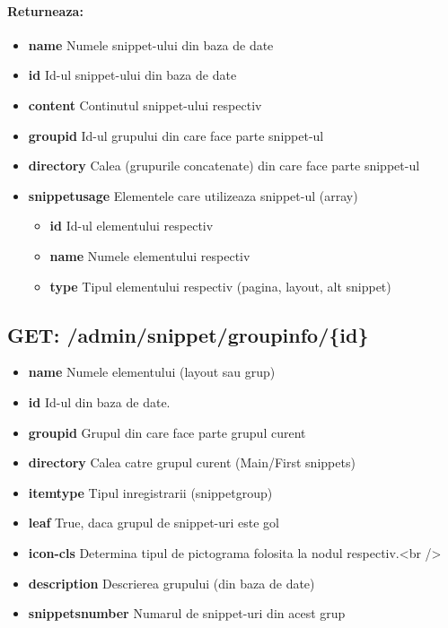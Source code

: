 \paragraph{Returneaza:}
\begin{itemize}
\item \textbf{name}
 Numele snippet-ului din baza de date
\item \textbf{id}
 Id-ul snippet-ului din baza de date
\item \textbf{content}
 Continutul snippet-ului respectiv
\item \textbf{groupid}
 Id-ul grupului din care face parte snippet-ul
\item \textbf{directory}
 Calea (grupurile concatenate) din care face parte snippet-ul
\item\textbf{snippetusage}
 Elementele care utilizeaza snippet-ul (array) \begin{itemize}
\item \textbf{id}
 Id-ul elementului respectiv
\item \textbf{name}
 Numele elementului respectiv
\item \textbf{type}
 Tipul elementului respectiv (pagina, layout, alt snippet)
 \end{itemize}
 \end{itemize}
 \subsection*{GET: /admin/snippet/groupinfo/\{id\}}

\begin{itemize}
\item \textbf{name}
 Numele elementului (layout sau grup)
\item \textbf{id}
 Id-ul din baza de date. 
\item \textbf{groupid}
 Grupul din care face parte grupul curent 
\item \textbf{directory}
 Calea catre grupul curent (Main/First snippets)
\item \textbf{itemtype}
 Tipul inregistrarii (snippetgroup)
\item \textbf{leaf}
 True, daca grupul de snippet-uri este gol
\item \textbf{icon-cls}
 Determina tipul de pictograma folosita la nodul respectiv.<br />
\item \textbf{description}
 Descrierea grupului (din baza de date)
\item \textbf{snippetsnumber}
 Numarul de snippet-uri din acest grup
 \end{itemize}
